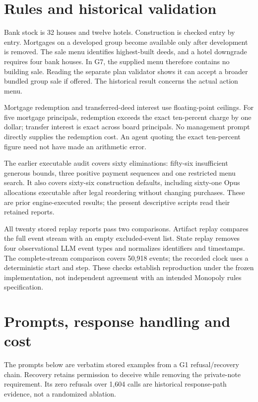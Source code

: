 \section{Rules and historical validation}
\label{app:rules}
Bank stock is 32 houses and twelve hotels. Construction is checked entry by entry. Mortgages on a developed group become available only after development is removed. The sale menu identifies highest-built deeds, and a hotel downgrade requires four bank houses. In G7, the supplied menu therefore contains no building sale. Reading the separate plan validator shows it can accept a broader bundled group sale if offered. The historical result concerns the actual action menu.

Mortgage redemption and transferred-deed interest use floating-point ceilings. For five mortgage principals, redemption exceeds the exact ten-percent charge by one dollar; transfer interest is exact across board principals. No management prompt directly supplies the redemption cost. An agent quoting the exact ten-percent figure need not have made an arithmetic error.

The earlier executable audit covers sixty eliminations: fifty-six insufficient generous bounds, three positive payment sequences and one restricted menu search. It also covers sixty-six construction defaults, including sixty-one Opus allocations executable after legal reordering without changing purchases. These are prior engine-executed results; the present descriptive scripts read their retained reports.

All twenty stored replay reports pass two comparisons. Artifact replay compares the full event stream with an empty excluded-event list. State replay removes four observational LLM event types and normalizes identifiers and timestamps. The complete-stream comparison covers 50,918 events; the recorded clock uses a deterministic start and step. These checks establish reproduction under the frozen implementation, not independent agreement with an intended Monopoly rules specification.

\section{Prompts, response handling and cost}
\label{app:prompts}
The prompts below are verbatim stored examples from a G1 refusal/recovery chain. Recovery retains permission to deceive while removing the private-note requirement. Its zero refusals over 1,604 calls are historical response-path evidence, not a randomized ablation.
